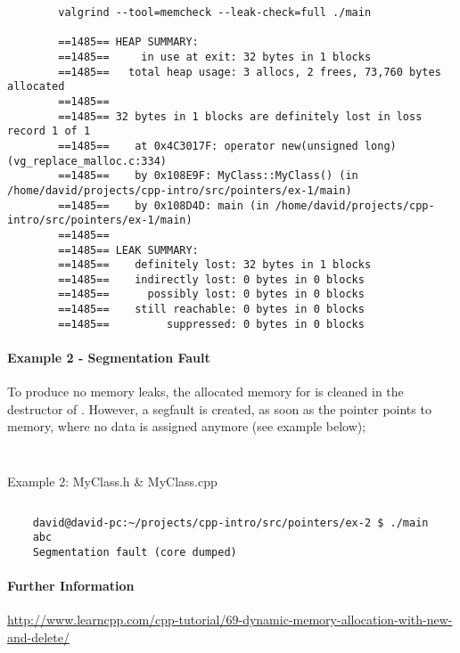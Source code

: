 	\begin{verbatim}
		valgrind --tool=memcheck --leak-check=full ./main
		
		==1485== HEAP SUMMARY:
		==1485==     in use at exit: 32 bytes in 1 blocks
		==1485==   total heap usage: 3 allocs, 2 frees, 73,760 bytes allocated
		==1485== 
		==1485== 32 bytes in 1 blocks are definitely lost in loss record 1 of 1
		==1485==    at 0x4C3017F: operator new(unsigned long) (vg_replace_malloc.c:334)
		==1485==    by 0x108E9F: MyClass::MyClass() (in /home/david/projects/cpp-intro/src/pointers/ex-1/main)
		==1485==    by 0x108D4D: main (in /home/david/projects/cpp-intro/src/pointers/ex-1/main)
		==1485== 
		==1485== LEAK SUMMARY:
		==1485==    definitely lost: 32 bytes in 1 blocks
		==1485==    indirectly lost: 0 bytes in 0 blocks
		==1485==      possibly lost: 0 bytes in 0 blocks
		==1485==    still reachable: 0 bytes in 0 blocks
		==1485==         suppressed: 0 bytes in 0 blocks
	\end{verbatim}
	
	\paragraph{Example 2 - Segmentation Fault}
	
	To produce no memory leaks, the allocated memory for  is cleaned in the destructor of . However, a segfault is created, as soon as the pointer points to memory, where no data is assigned anymore (see example below);
	
	\begin{listing}[!htbp]
		\begin{minipage}[t]{0.45\textwidth}
			\inputminted{cpp}{src/pointers/ex-2/MyClass.h}
		\end{minipage}\hfill
		\begin{minipage}[t]{0.45\textwidth}
			\inputminted{cpp}{src/pointers/ex-2/MyClass.cpp}
		\end{minipage}
		\caption{Example 2: MyClass.h \& MyClass.cpp}
	\end{listing}

	\inputminted{cpp}{src/pointers/ex-2/main.cpp}
	
	\begin{verbatim}
	david@david-pc:~/projects/cpp-intro/src/pointers/ex-2 $ ./main 
	abc
	Segmentation fault (core dumped)
	\end{verbatim}
	
	\paragraph{Further Information}
	
	\url{http://www.learncpp.com/cpp-tutorial/69-dynamic-memory-allocation-with-new-and-delete/}